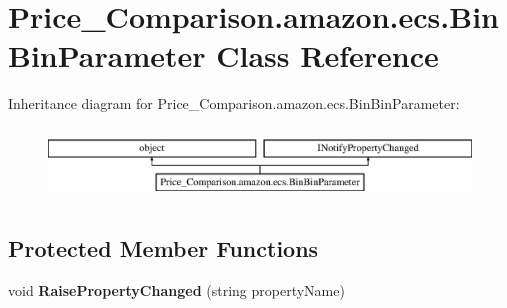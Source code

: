 \hypertarget{class_price___comparison_1_1amazon_1_1ecs_1_1_bin_bin_parameter}{\section{Price\-\_\-\-Comparison.\-amazon.\-ecs.\-Bin\-Bin\-Parameter Class Reference}
\label{class_price___comparison_1_1amazon_1_1ecs_1_1_bin_bin_parameter}
}


 


Inheritance diagram for Price\-\_\-\-Comparison.\-amazon.\-ecs.\-Bin\-Bin\-Parameter\-:\begin{figure}[H]
\begin{center}
\leavevmode
\includegraphics[height=1.911263cm]{class_price___comparison_1_1amazon_1_1ecs_1_1_bin_bin_parameter}
\end{center}
\end{figure}
\subsection*{Protected Member Functions}
\begin{DoxyCompactItemize}
\item 
\hypertarget{class_price___comparison_1_1amazon_1_1ecs_1_1_bin_bin_parameter_a8fc25f17c37dbdf8251395fc849ba88c}{void {\bfseries Raise\-Property\-Changed} (string property\-Name)}\label{class_price___comparison_1_1amazon_1_1ecs_1_1_bin_bin_parameter_a8fc25f17c37dbdf8251395fc849ba88c}

\end{DoxyCompactItemize}
